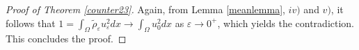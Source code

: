 \documentclass[11pt,a4paper]{amsart}
\numberwithin{equation}{section}
\newtheorem{rem}[equation]{Remark}
\begin{document}
\begin{proof}[Proof of Theorem \ref{counter23}]
Again, from Lemma \ref{meanlemma}, $iv)$ and $v)$, it follows that $1=\int_{\Omega}\tilde\rho_{\varepsilon}u_{\varepsilon}^2dx\rightarrow\int_{\Omega}u_0^2dx$ as $\varepsilon\rightarrow 0^+$, which yields the contradiction. This concludes the proof.

\end{proof}




\end{document}
